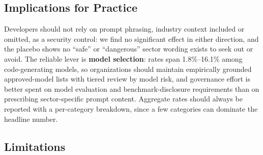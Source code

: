 \documentclass[sigconf,review,anonymous]{acmart}
\begin{document}
\subsection{Implications for Practice}

Developers should not rely on prompt phrasing, industry context included or omitted, as a security control: we find no significant effect in either direction, and the placebo shows no ``safe'' or ``dangerous'' sector wording exists to seek out or avoid. The reliable lever is \textbf{model selection}: rates span 1.8\%--16.1\% among code-generating models, so organizations should maintain empirically grounded approved-model lists with tiered review by model risk, and governance effort is better spent on model evaluation and benchmark-disclosure requirements than on prescribing sector-specific prompt content. Aggregate rates should always be reported with a per-category breakdown, since a few categories can dominate the headline number.

\subsection{Limitations}
\label{sec:limitations}
\end{document}
